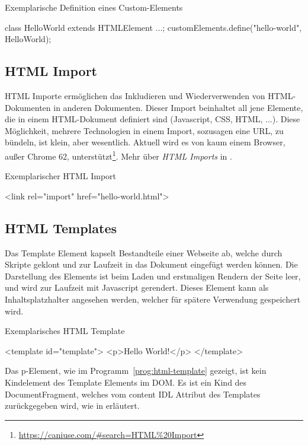 \begin{program}[!htbp]
\caption{Exemplarische Definition eines Custom-Elements}
\begin{JsCode}
class HelloWorld extends HTMLElement {...};
customElements.define("hello-world", HelloWorld);
\end{JsCode}
\end{program}
\subsection{HTML Import}
HTML Importe ermöglichen das Inkludieren und Wiederverwenden von HTML-Dokumenten in anderen Dokumenten. Dieser Import beinhaltet all jene Elemente, die in einem HTML-Dokument definiert sind (Javascript, CSS, HTML, ...). 
Diese Möglichkeit, mehrere Technologien in einem Import, sozusagen eine URL, zu bündeln, ist klein, aber wesentlich. Aktuell wird es von kaum einem Browser, außer Chrome 62,  unterstützt\footnote{\url{https://caniuse.com/\#search=HTML\%20Import}}. Mehr über \emph{HTML Imports} in \cite{html-imports}.

\begin{program}[!htbp]
\caption{Exemplarischer HTML Import}
\begin{JsCode}
<link rel="import" href="hello-world.html">
\end{JsCode}
\end{program}
\subsection{HTML Templates}
Das Template Element kapselt Bestandteile einer Webseite ab, welche durch Skripte geklont und zur Laufzeit in das Dokument eingefügt werden können. Die Darstellung des Elements ist beim Laden und erstmaligen Rendern der Seite leer, und wird zur Laufzeit mit Javascript gerendert. Dieses Element kann als Inhaltsplatzhalter angesehen werden, welcher für spätere Verwendung gespeichert wird. 

\begin{program}[!htbp]
\caption{Exemplarisches HTML Template}
\label{prog:html-template}
\begin{JsCode}
<template id="template">
	<p>Hello World!</p>
</template>
\end{JsCode}
\end{program}
Das p-Element, wie im Programm~\ref{prog:html-template} gezeigt, ist kein Kindelement des Template Elements im DOM. Es ist ein Kind des DocumentFragment, welches vom content IDL Attribut des Templates zurückgegeben wird, wie in \cite{html-templates} erläutert.

